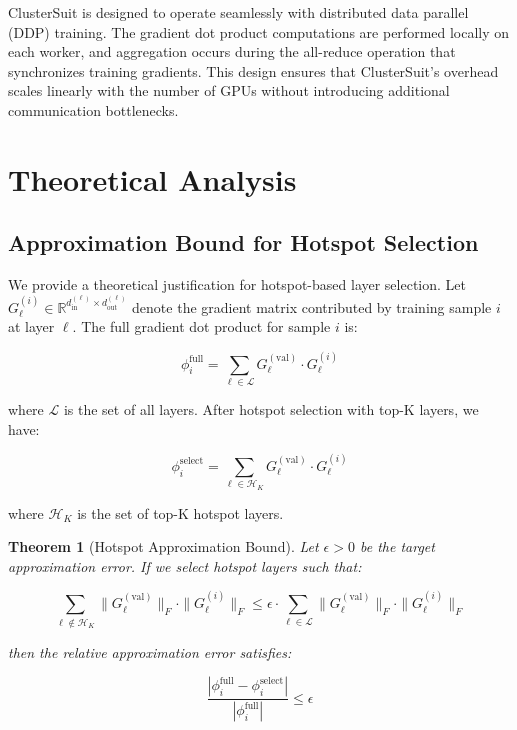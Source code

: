 \documentclass[12pt,a4paper]{report}
\newtheorem{theorem}{Theorem}[chapter]
\begin{document}
ClusterSuit is designed to operate seamlessly with distributed data parallel (DDP) training. The gradient dot product computations are performed locally on each worker, and aggregation occurs during the all-reduce operation that synchronizes training gradients. This design ensures that ClusterSuit's overhead scales linearly with the number of GPUs without introducing additional communication bottlenecks.

\section{Theoretical Analysis}
\label{sec:theory}

\subsection{Approximation Bound for Hotspot Selection}
\label{sec:hotspot_bound}

We provide a theoretical justification for hotspot-based layer selection. Let $G_\ell^{(i)} \in \mathbb{R}^{d_{\text{in}}^{(\ell)} \times d_{\text{out}}^{(\ell)}}$ denote the gradient matrix contributed by training sample $i$ at layer $\ell$. The full gradient dot product for sample $i$ is:

\begin{equation}
    \phi_{i}^{\text{full}} = \sum_{\ell \in \mathcal{L}} G_\ell^{(\text{val})} \cdot G_\ell^{(i)}
    \label{eq:full_dot_product}
\end{equation}

where $\mathcal{L}$ is the set of all layers. After hotspot selection with top-K layers, we have:

\begin{equation}
    \phi_{i}^{\text{select}} = \sum_{\ell \in \mathcal{H}_K} G_\ell^{(\text{val})} \cdot G_\ell^{(i)}
    \label{eq:select_dot_product}
\end{equation}

where $\mathcal{H}_K$ is the set of top-K hotspot layers.

\begin{theorem}[Hotspot Approximation Bound]
    Let $\epsilon > 0$ be the target approximation error. If we select hotspot layers such that:
    
    \begin{equation}
        \sum_{\ell \notin \mathcal{H}_K} \| G_\ell^{(\text{val})} \|_F \cdot \| G_\ell^{(i)} \|_F \leq \epsilon \cdot \sum_{\ell \in \mathcal{L}} \| G_\ell^{(\text{val})} \|_F \cdot \| G_\ell^{(i)} \|_F
        \label{eq:hotspot_condition}
    \end{equation}
    
    then the relative approximation error satisfies:
    
    \begin{equation}
        \frac{|\phi_i^{\text{full}} - \phi_i^{\text{select}}|}{|\phi_i^{\text{full}}|} \leq \epsilon
        \label{eq:hotspot_error}
    \end{equation}
    \label{th:hotspot_bound}
\end{theorem}
\end{document}
